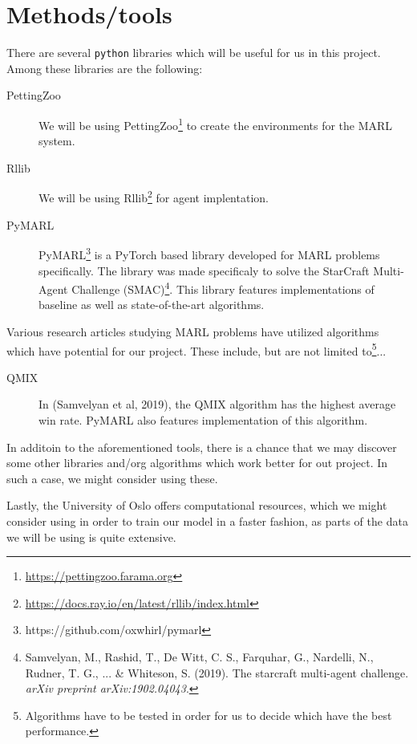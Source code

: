 \documentclass{article}
\begin{document}
\section{Methods/tools}
There are several \texttt{python} libraries which will be useful for us in this project.
Among these libraries are the following:
\begin{description}
  \item[PettingZoo] We will be using PettingZoo\footnote[1]{\url{https://pettingzoo.farama.org}}
    to create the environments for the MARL system.
  \item[Rllib] We will be using Rllib\footnote[2]{\url{https://docs.ray.io/en/latest/rllib/index.html}}
    for agent implentation.
  \item[PyMARL] PyMARL\footnote[3]{https://github.com/oxwhirl/pymarl} is a PyTorch based library
    developed for MARL problems specifically. The library was made specificaly to solve the StarCraft
    Multi-Agent Challenge (SMAC)\footnote[4]{Samvelyan, M., Rashid, T., De Witt, C. S., Farquhar, G., Nardelli, N., Rudner, T. G., ... \& Whiteson, S. (2019). The starcraft multi-agent challenge. \textit{arXiv preprint arXiv:1902.04043}.}. %
    This library features implementations of baseline as well as state-of-the-art algorithms.
\end{description}

\noindent
Various research articles studying MARL problems have utilized algorithms which have potential for our
project.
These include, but are not limited to\footnote[5]{Algorithms have to be tested in order for us to decide
which have the best performance.}...
\begin{description}
  \item[QMIX] In (Samvelyan et al, 2019), the QMIX algorithm has the highest average win
    rate. PyMARL also features implementation of this algorithm.
\end{description}

\noindent
In additoin to the aforementioned tools, there is a chance that we may discover some other libraries and/org
algorithms which work better for out project. In such a case, we might consider using these.

Lastly, the University of Oslo offers computational resources, which we might consider using in order to
train our model in a faster fashion, as parts of the data we will be using is quite extensive.
\end{document}
